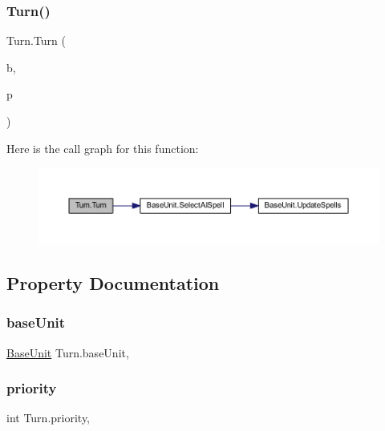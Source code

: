 \subsubsection{\texorpdfstring{Turn()}{Turn()}}
{\footnotesize\ttfamily Turn.\+Turn (\begin{DoxyParamCaption}\item[{\mbox{\hyperlink{class_base_unit}{Base\+Unit}}}]{b,  }\item[{int}]{p }\end{DoxyParamCaption})}

Here is the call graph for this function\+:\nopagebreak
\begin{figure}[H]
\begin{center}
\leavevmode
\includegraphics[width=350pt]{class_turn_a6446f2b617305c390dce97e1c7242066_cgraph}
\end{center}
\end{figure}


\subsection{Property Documentation}
\mbox{\label{class_turn_a59d549b1393677617e4237dcab3e27f9}} 
\subsubsection{\texorpdfstring{baseUnit}{baseUnit}}
{\footnotesize\ttfamily \mbox{\hyperlink{class_base_unit}{Base\+Unit}} Turn.\+base\+Unit\hspace{0.3cm}{\ttfamily [get]}, {\ttfamily [set]}}

\mbox{\label{class_turn_aad40e669aa7299a23aa01c1756edd975}} 
\subsubsection{\texorpdfstring{priority}{priority}}
{\footnotesize\ttfamily int Turn.\+priority\hspace{0.3cm}{\ttfamily [get]}, {\ttfamily [set]}}

